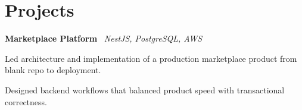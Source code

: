 \section{Projects}

    \hspace{0.5em} \textbf{Marketplace Platform} \textbar \  \textit{NestJS, PostgreSQL, AWS}

    \vspace{0.10 cm}
    \begin{onecolentry}
        \begin{highlights}
            \item Led architecture and implementation of a production marketplace product from blank repo to deployment.
            \item Designed backend workflows that balanced product speed with transactional correctness.
        \end{highlights}
    \end{onecolentry}
    \vspace{0.10 cm}


